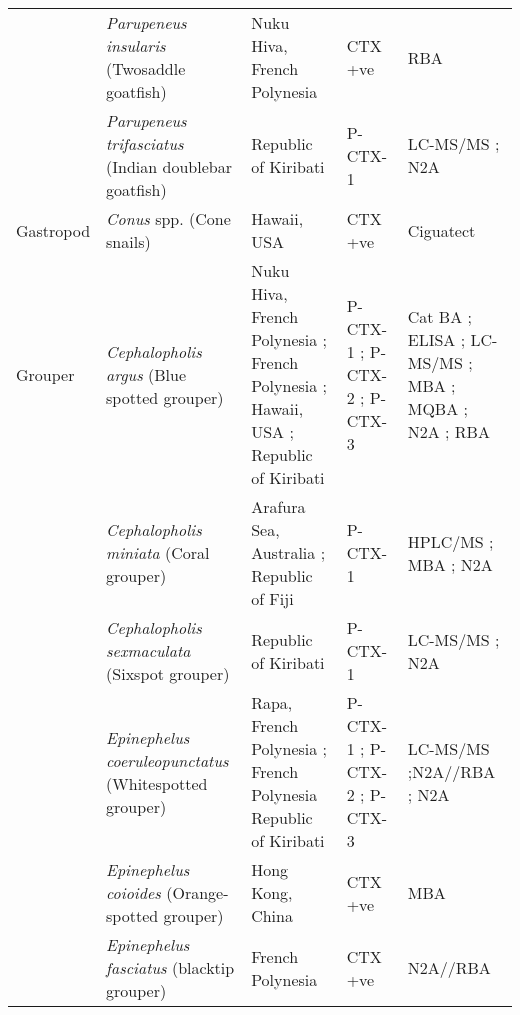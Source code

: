 \documentclass[12pt]{article}
\begin{document}
\begin{longtable}[l]{ | p{2cm} | p{3cm} | p{4.5cm} | p{2cm} | p{3cm} | }
	& \emph{Parupeneus insularis} (Twosaddle goatfish) & Nuku Hiva, French Polynesia \cite{darius2007ciguatera} & CTX +ve \cite{darius2007ciguatera} & RBA \cite{darius2007ciguatera} \\
		& \emph{Parupeneus trifasciatus} (Indian doublebar goatfish) & Republic of Kiribati \cite{mak2013pacific} & P-CTX-1 \cite{mak2013pacific} & LC-MS/MS \cite{mak2013pacific}; N2A \cite{mak2013pacific} \\
	\hline
	Gastropod & \emph{Conus} spp. (Cone snails) & Hawaii, USA \cite{park2000microbial} & CTX +ve \cite{park2000microbial} & Ciguatect \textregistered \cite{park2000microbial} \\
	\hline
	Grouper & \emph{Cephalopholis argus} (Blue spotted grouper) & Nuku Hiva, French Polynesia \cite{darius2007ciguatera}; French Polynesia \cite{bagnis1987use}; Hawaii, USA \cite{campora2008detection}; Republic of Kiribati \cite{mak2013pacific} & P-CTX-1 \cite{mak2013pacific}; P-CTX-2 \cite{mak2013pacific}; P-CTX-3 \cite{mak2013pacific} & Cat BA \cite{bagnis1987use}; ELISA \cite{campora2008detection}; LC-MS/MS \cite{mak2013pacific}; MBA \cite{bagnis1987use}; MQBA \cite{bagnis1987use}; N2A \cite{campora2008detection,mak2013pacific}; RBA \cite{darius2007ciguatera} \\
	& \emph{Cephalopholis miniata} (Coral grouper) & Arafura Sea, Australia \cite{lucas1997pacific}; Republic of Fiji \cite{arnett2007ciguatera,dickey2008ciguatera} & P-CTX-1 \cite{arnett2007ciguatera,lucas1997pacific,dickey2008ciguatera} & HPLC/MS \cite{lucas1997pacific}; MBA \cite{lucas1997pacific}; N2A \cite{arnett2007ciguatera,dickey2008ciguatera} \\
	& \emph{Cephalopholis sexmaculata} (Sixspot grouper) & Republic of Kiribati \cite{mak2013pacific} & P-CTX-1 \cite{mak2013pacific} & LC-MS/MS \cite{mak2013pacific}; N2A \cite{mak2013pacific} \\
	& \emph{Epinephelus coeruleopunctatus} (Whitespotted grouper) & Rapa, French Polynesia \cite{pawlowiez2013evaluation}; French Polynesia \cite{chinain2014mail} Republic of Kiribati \cite{mak2013pacific} & P-CTX-1 \cite{mak2013pacific}; P-CTX-2 \cite{mak2013pacific}; P-CTX-3 \cite{mak2013pacific} &  LC-MS/MS \cite{mak2013pacific};N2A//RBA \cite{chinain2014mail}; N2A \cite{mak2013pacific,pawlowiez2013evaluation} \\
	& \emph{Epinephelus coioides} (Orange-spotted grouper) & Hong Kong, China \cite{wong2005study} & CTX +ve \cite{wong2005study} & MBA \cite{wong2005study} \\
	& \emph{Epinephelus fasciatus} (blacktip grouper) & French Polynesia \cite{chinain2014mail} & CTX +ve \cite{chinain2014mail} & N2A//RBA \cite{chinain2014mail} \\

\end{longtable}
\end{document}
